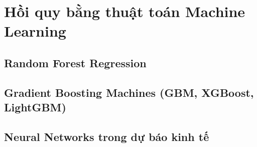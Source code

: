 \chapter{Hồi quy bằng thuật toán Machine Learning}
\section{Random Forest Regression}
\section{Gradient Boosting Machines (GBM, XGBoost, LightGBM)}
\section{Neural Networks trong dự báo kinh tế}